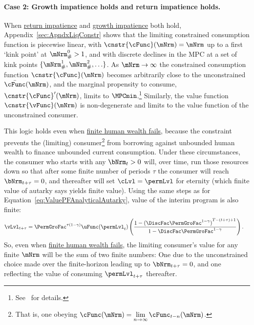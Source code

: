 \documentclass[BufferStockTheory]{subfiles}
\begin{document}
\paragraph{Case 2: Growth impatience holds and return impatience holds.}
When  \hyperlink{RIC}{return impatience} and  \hyperlink{GIC}{growth impatience} both hold, Appendix~\ref{sec:ApndxLiqConstr} shows that the limiting constrained consumption function is piecewise linear, with $\cnstr{\cFunc}(\mNrm)=\mNrm$ up to a first `kink point' at $\mNrm_{\#}^{0}>1$, and with discrete declines in the MPC at a set of kink points $\{\mNrm_{\#}^{1},\mNrm_{\#}^{2},\ldots\}$.
As $\mNrm \rightarrow \infty$ the constrained consumption function $\cnstr{\cFunc}(\mNrm)$ becomes arbitrarily close to the unconstrained $\bar{\cFunc}(\mNrm)$, and the marginal propensity to consume, $\cnstr{\cFunc}^{\prime}(\mNrm)$, limits to $\MPCmin$.\footnote{See~\cite{chkLiqConstr} for details.}
Similarly, the value function $\cnstr{\vFunc}(\mNrm)$ is non-degenerate and limits to the value function of the unconstrained consumer.


This logic holds even when \hyperlink{FHWC}{finite human wealth fails}, because the constraint prevents the (limiting) consumer\footnote{That is, one obeying $\cFunc(\mNrm) = \lim\limits_{n \rightarrow \infty} \cFunc_{t-n}(\mNrm)$.} from borrowing against unbounded human wealth to finance unbounded current consumption.
Under these circumstances, the consumer who starts with any $\bNrm_{t} > 0$ will, over time, run those resources down so that after some finite number of periods $\tau$ the consumer will reach $\bNrm_{t+\tau} = 0$, and thereafter will set $\cLvl = \permLvl$ for eternity (which \hypertarget{PFFVAC}{finite value of autarky} says yields finite value).
Using the same steps as for Equation~\eqref{eq:ValuePFAnalyticalAutarky}, value of the interim program is also finite: \hypertarget{PFFVAC}{}
\begin{equation}\begin{gathered}\begin{aligned}
  \vLvl_{t+\tau} 
  & = \PermGroFac^{\tau(1-\CRRA)} \uFunc(\permLvl_{t})\left(\frac{1-{(\DiscFac \PermGroFac^{1-\CRRA})}^{T-(t+\tau)+1}}{1-\DiscFac \PermGroFac^{1-\CRRA}}\right).
\end{aligned}\end{gathered}\end{equation}
So, even when \hyperlink{FHWC}{finite human wealth fails}, the limiting consumer's value for any finite $\mNrm$ will be the sum of two finite numbers: One due to the unconstrained choice made over the finite-horizon leading up to $\bNrm_{t+\tau} = 0$, and one reflecting the value of consuming $\permLvl_{t+\tau}$ thereafter.
\end{document}
